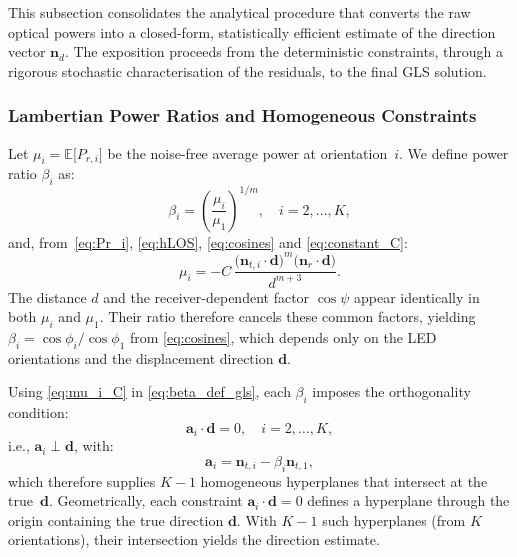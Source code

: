 \documentclass[journal]{IEEEtran}
\begin{document}
This subsection consolidates the analytical procedure that converts the raw optical powers into a closed-form, statistically efficient estimate of the direction vector $\mathbf{n}_d$. The exposition proceeds from the deterministic constraints, through a rigorous stochastic characterisation of the residuals, to the final GLS solution. 

\subsubsection{Lambertian Power Ratios and Homogeneous Constraints}
Let $\mu_i=\mathbb E\!\bigl[P_{r,i}\bigr]$ be the noise-free average power at orientation~$i$. We define power ratio $\beta_i$ as:
\begin{equation}
  \beta_i=\left(\frac{\mu_i}{\mu_1}\right)^{1/m}, \quad i=2,\ldots,K,
  \label{eq:beta_def_gls}
\end{equation}
and, from~\eqref{eq:Pr_i}, \eqref{eq:hLOS}, \eqref{eq:cosines} and \eqref{eq:constant_C}:
\begin{equation}
\mu_i=-C\,\frac{\bigl(\mathbf{n}_{t,i}\cdot\mathbf{d}\bigr)^{m}
\bigl(\mathbf{n}_r\cdot\mathbf{d}\bigr)}{d^{m+3}}.
\label{eq:mu_i_C}
\end{equation}
The distance $d$ and the receiver-dependent factor $\cos\psi$ appear identically in both $\mu_i$ and $\mu_1$. Their ratio therefore cancels these common factors, yielding $\beta_i = \cos\phi_i / \cos\phi_1$ from \eqref{eq:cosines}, which depends only on the LED orientations and the displacement direction $\mathbf{d}$.

Using \eqref{eq:mu_i_C} in \eqref{eq:beta_def_gls}, each $\beta_i$ imposes the orthogonality condition:
\begin{equation}
  \mathbf a_i\cdot
  \mathbf d=0,
  \quad
  i=2,\ldots,K,
  \label{eq:homog_gls}
\end{equation}
i.e., $\mathbf a_i \perp \mathbf d$, with:
\begin{equation}
\mathbf a_i\!=\!\mathbf n_{t,i}-\beta_i\mathbf n_{t,1}, 
\label{eq:definition_a_i}
\end{equation}
which therefore supplies $K-1$ homogeneous hyperplanes that intersect at the true~$\mathbf d$.
Geometrically, each constraint $\mathbf{a}_i\cdot\mathbf{d}=0$ defines a hyperplane through the origin containing the true direction $\mathbf{d}$. With $K-1$ such hyperplanes (from $K$ orientations), their intersection yields the direction estimate.
\end{document}

